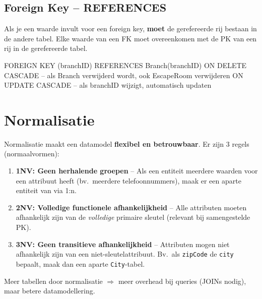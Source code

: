 \documentclass[a4paper,11pt]{article}
\begin{document}
\subsection{Foreign Key -- REFERENCES}

\begin{theorie}
Als je een waarde invult voor een foreign key, \textbf{moet} de gerefereerde rij bestaan in de andere tabel.
Elke waarde van een FK moet overeenkomen met de PK van een rij in de gerefereerde tabel.
\end{theorie}

\begin{voorbeeld}
\begin{sqllisting}
FOREIGN KEY (branchID)
    REFERENCES Branch(branchID)
    ON DELETE CASCADE    -- als Branch verwijderd wordt, ook EscapeRoom verwijderen
    ON UPDATE CASCADE    -- als branchID wijzigt, automatisch updaten
\end{sqllisting}
\end{voorbeeld}

\section{Normalisatie}

\begin{conceptbox}
Normalisatie maakt een datamodel \textbf{flexibel en betrouwbaar}. Er zijn 3 regels (normaalvormen):
\begin{enumerate}
  \item \textbf{1NV: Geen herhalende groepen} -- Als een entiteit meerdere waarden voor een attribuut heeft (bv.\ meerdere telefoonnummers), maak er een aparte entiteit van via 1:n.
  \item \textbf{2NV: Volledige functionele afhankelijkheid} -- Alle attributen moeten afhankelijk zijn van de \emph{volledige} primaire sleutel (relevant bij samengestelde PK).
  \item \textbf{3NV: Geen transitieve afhankelijkheid} -- Attributen mogen niet afhankelijk zijn van een niet-sleutelattribuut. Bv.\ als \texttt{zipCode} de \texttt{city} bepaalt, maak dan een aparte \texttt{City}-tabel.
\end{enumerate}
\end{conceptbox}

\begin{waarschuwing}
Meer tabellen door normalisatie $\Rightarrow$ meer overhead bij queries (JOINs nodig), maar betere datamodellering.
\end{waarschuwing}
\end{document}
